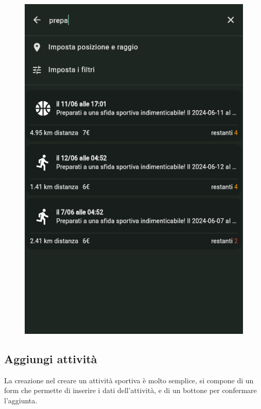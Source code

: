 \documentclass[a4paper,12pt]{article}
\begin{document}
\begin{figure}[h]
\begin{minipage}{0.32\textwidth}
        \includegraphics[width=1\linewidth]{img/search_activity.png}
    \end{minipage}
\end{figure}

\subsection{Aggiungi attività}

La creazione nel creare un attività sportiva è molto semplice, si compone di un form che permette di inserire i dati dell'attività, e di un bottone per confermare l'aggiunta.
\end{document}
